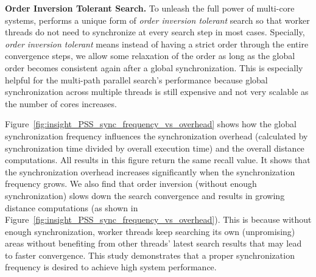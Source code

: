 \noindent\textbf{Order Inversion Tolerant Search.} 
To unleash the full power of multi-core systems, \Hammer performs a unique form of \emph{order inversion tolerant} search so that worker threads do not need to synchronize at every search step in most cases. 
Specially, \emph{order inversion tolerant} means instead of having a strict order through the entire convergence steps, we allow some relaxation of the order as long as the global order becomes consistent again after a global synchronization.
This is especially helpful for the multi-path parallel search's performance because global synchronization across multiple threads is still expensive and not very scalable as the number of cores increases. 

Figure~\ref{fig:insight_PSS_sync_frequency_vs_overhead} shows how the global synchronization frequency influences the synchronization overhead (calculated by synchronization time divided by  overall execution time) and the overall distance computations. All results in this figure return the same recall value. 
It shows that the synchronization overhead increases significantly when the synchronization frequency grows.
We also find that order inversion (without enough synchronization) slows down the search convergence and results in growing distance computations (as shown in Figure~\ref{fig:insight_PSS_sync_frequency_vs_overhead}). This is because without enough synchronization, worker threads keep searching its own (unpromising) areas without benefiting from other threads' latest search results that may lead to faster convergence. This study demonstrates that a proper synchronization frequency is desired to achieve high system performance.  



